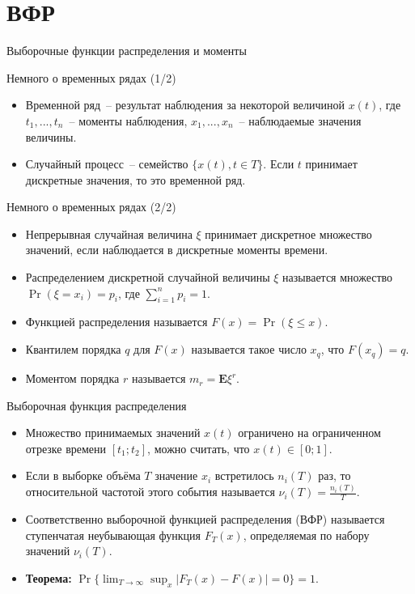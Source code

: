 \documentclass[aspectratio=169]{beamer}
\begin{document}
\section{ВФР}

\begin{frame}
\begin{center}
  \Huge{Выборочные функции распределения и моменты}
\end{center}
\end{frame}

\begin{frame}{Немного о временных рядах (1/2)}
  \begin{itemize}
  \item {
    Временной ряд~-- результат наблюдения за некоторой величиной $x(t)$, где $t_1, ..., t_n$~-- моменты наблюдения, $x_1, ..., x_n$~-- наблюдаемые значения величины.
  }
  \item {
    Случайный процесс~-- семейство $\{x(t), t \in T\}$. Если $t$ принимает дискретные значения, то это временной ряд.
  }
  \end{itemize}
\end{frame}

\begin{frame}{Немного о временных рядах (2/2)}
  \begin{itemize}
  \item {
    Непрерывная случайная величина $\xi$ принимает дискретное множество значений, если наблюдается в дискретные моменты времени.
  }
  \item {
    Распределением дискретной случайной величины $\xi$ называется множество $\Pr(\xi = x_i) = p_i$, где $\sum_{i=1}^n{p_i} = 1$.
  }
  \item {
    Функцией распределения называется $F(x) = \Pr(\xi \leqslant x)$.
  }
  \item {
    Квантилем порядка $q$ для $F(x)$ называется такое число $x_q$, что $F(x_q) = q$.
  }
  \item {
    Моментом порядка $r$ называется $m_r = \mathbf{E}{\xi^r}$.
  }
  \end{itemize}
\end{frame}

\begin{frame}{Выборочная функция распределения}
  \begin{itemize}
  \item {
    Множество принимаемых значений $x(t)$ ограничено на ограниченном отрезке времени $[t_1; t_2]$, можно считать, что $x(t) \in [0; 1]$.
  }
  \item {
    Если в выборке объёма $T$ значение $x_i$ встретилось $n_i(T)$ раз, то относительной частотой этого события называется $\nu_i(T) = \frac{n_i(T)}{T}$.
  }
  \item {
    Соответственно выборочной функцией распределения (ВФР) называется ступенчатая неубывающая функция $F_T(x)$, определяемая по набору значений $\nu_i(T)$.
  }
  \item {
    \textbf{Теорема:} $\Pr\{\lim_{T \to \infty}{\sup_x{|F_T(x)-F(x)|}} = 0\} = 1$.
  }
  \end{itemize}
\end{frame}
\end{document}
